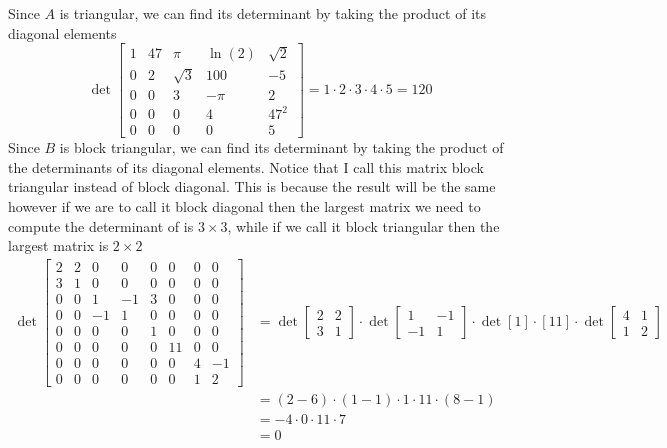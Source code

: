 \documentclass{report}
\begin{document}
\sol Since $A$ is triangular,  we can find its determinant by taking the product of its diagonal elements 
$$
\operatorname{det}\begin{bmatrix}
1&47&\pi&\ln(2)&\sqrt{2}\\ 
0&2 & \sqrt{3}&100&-5\\
0&0&3&-\pi&2\\
0&0&0&4&47^2 \\
0&0&0&0&5 
\end{bmatrix} = 1 \cdot 2 \cdot 3 \cdot 4 \cdot 5 = 120
$$
Since $B$ is block triangular,  we can find its determinant by taking the product of the determinants of its diagonal elements.  Notice that I call this matrix block triangular instead of block diagonal. This is because the result will be the same however if we are to call it block diagonal then the largest matrix we need to compute the determinant of is $3\times3$, while if we call it block triangular then the largest matrix is $2\times2$
$$
\begin{aligned}
\operatorname{det}\begin{bmatrix} 
2&2&0&0&0&0&0&0\\
3&1&0&0&0&0&0&0\\
0&0&1&-1&3&0&0&0\\
0&0&-1&1&0&0&0&0\\
0&0&0&0&1&0&0&0\\
0&0&0&0&0&11&0&0\\
0&0&0&0&0&0&4&-1\\
0&0&0&0&0&0&1&2
\end{bmatrix} & = 
\operatorname{det}\begin{bmatrix}
2 & 2 \\
3 & 1
\end{bmatrix} \cdot \operatorname{det}\begin{bmatrix}
1 & -1\\
-1 & 1
\end{bmatrix} \cdot \operatorname{det}\left[1\right] \cdot
\left[11\right] \cdot \operatorname{det}\begin{bmatrix}
4 & 1 \\ 1 & 2
\end{bmatrix} \\
& = (2 - 6) \cdot (1 - 1) \cdot 1 \cdot 11 \cdot (8 - 1) \\
& = -4 \cdot 0 \cdot 11 \cdot 7 \\
& = 0
\end{aligned}
$$
\end{document}
